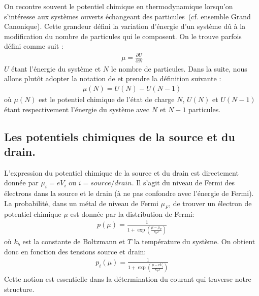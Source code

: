On recontre souvent le potentiel chimique en thermodynamique lorsqu'on s'intéresse aux systèmes ouverts échangeant des particules~(cf. ensemble Grand Canonique). Cette grandeur défini la variation d'énergie d'un système d\^u à la modification du nombre de particules qui le composent. On le trouve parfois défini comme suit :
\begin{eqnarray}
\mu = \frac{\partial U}{\partial N} \nonumber
\end{eqnarray}
$U$ étant l'énergie du système et $N$ le nombre de particules. Dans la suite, nous allons plut\^ot adopter la notation de \cite{Hanson2007} et prendre la définition suivante :
\begin{eqnarray}
\mu(N) = U(N) - U(N-1)
\label{potchimeq}
\end{eqnarray}
où $\mu(N)$ est le potentiel chimique de l'état de charge $N$, $U(N)$ et $U(N-1)$ étant respectivement l'énergie du système avec $N$ et $N-1$ particules.


\subsection{Les potentiels chimiques de la source et du drain.}
L'expression du potentiel chimique de la source et du drain est directement donnée par $\mu_i = e V_i$ ou $i=source/drain$. Il s'agit du niveau de Fermi des électrons dans la source et le drain (à ne pas confondre avec l'énergie de Fermi). La probabilité, dans un métal de niveau de Fermi $\mu_F$, de trouver un électron de potentiel chimique $\mu$ est donnée par la distribution de Fermi:
\begin{eqnarray}
p(\mu) = \frac{1}{1 + \exp{(\frac{\mu - \mu_F}{k_bT})}} \nonumber
\end{eqnarray}
où $k_b$ est la constante de Boltzmann et $T$ la température du système. On obtient donc en fonction des tensions source et drain:
\begin{eqnarray}
p_i(\mu) = \frac{1}{1 + \exp{(\frac{\mu - eV_i}{k_bT})}}
\end{eqnarray}
Cette notion est essentielle dans la détermination du courant qui traverse notre structure.

